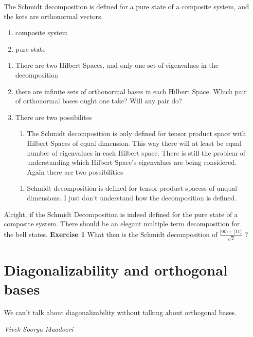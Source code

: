 \documentclass[a4paper,12pt]{amsbook}
\newcommand{\0}{{$|0\rangle$}}
\newcommand{\1}{{$|1\rangle$}}
\begin{document}
The Schmidt decomposition is defined for a pure state of a composite system, and the kets are orthonormal vectors. 
\begin{enumerate}
    \item composite system 
    \item pure state
\end{enumerate}
\begin{enumerate}
\item There are two Hilbert Spaces, and only one set of eigenvalues in the decomposition 
\item there are infinite sets of orthonormal bases in each Hilbert Space. Which pair of orthonormal bases ought one take? Will any pair do? 
\item There are two possibilites
\begin{enumerate}
\item The Schmidt decomposition is only defined for tensor product space with Hilbert Spaces of equal dimension. This way there will at least be equal number of eigenvalues in each Hilbert space. There is still the problem of understanding which Hilbert Space's eigenvalues are being considered. Again there are two possibilities 
\end{enumerate}
\begin{enumerate}
\item  Schmidt decomposition is defined for tensor product spacess of unqual dimensions. I just don't understand how the decomposition is defined.
\end{enumerate}
\end{enumerate}

Alright, if the Schmidt Decomposition is indeed defined for the pure state of a composite system. There should be an elegant multiple term decomposition for the bell states. 
\textbf{Exercise 1}
What then is the Schmidt decomposition of $ \frac{ |00\rangle + |11\rangle  }{ \sqrt2 } $  ? 

\chapter{Diagonalizability and orthogonal bases}
    \epigraph{We can't talk about diagonalizability without talking about orthogonal bases.}{\textit{Vivek Soorya Maadoori}}
\end{document}
